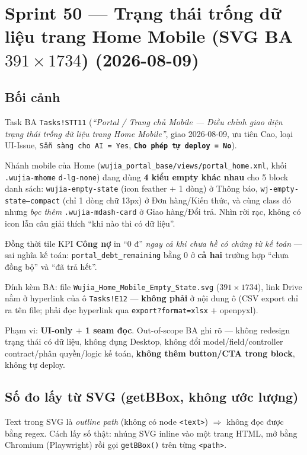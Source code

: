 \chapter{Sprint 50 --- Trạng thái trống dữ liệu trang Home Mobile (SVG BA $391\times1734$) (2026-08-09)}

\section{Bối cảnh}

Task BA \texttt{Tasks!STT11} (\emph{``Portal / Trang chủ Mobile --- Điều chỉnh giao diện trạng
thái trống dữ liệu trang Home Mobile''}, giao 2026-08-09, ưu tiên Cao, loại UI-Issue,
\texttt{Sẵn sàng cho AI = Yes}, \textbf{\texttt{Cho phép tự deploy = No}}).

Nhánh mobile của Home (\texttt{wujia\_portal\_base/views/portal\_home.xml}, khối
\texttt{.wujia-mhome} \texttt{d-lg-none}) đang dùng \textbf{4 kiểu empty khác nhau} cho 5 block
danh sách: \texttt{wujia-empty-state} (icon feather $+$ 1 dòng) ở Thông báo,
\texttt{wj-empty-state--compact} (chỉ 1 dòng chữ 13px) ở Đơn hàng/Kiến thức, và cùng class đó
nhưng \emph{bọc thêm} \texttt{.wujia-mdash-card} ở Giao hàng/Đổi trả. Nhìn rời rạc, không có icon
lẫn câu giải thích ``khi nào thì có dữ liệu''.

Đồng thời tile KPI \textbf{Công nợ} in ``0 đ'' \emph{ngay cả khi chưa hề có chứng từ kế toán} ---
sai nghĩa kế toán: \texttt{portal\_debt\_remaining} bằng $0$ ở \textbf{cả hai} trường hợp ``chưa
đồng bộ'' và ``đã trả hết''.

Đính kèm BA: file \texttt{Wujia\_Home\_Mobile\_Empty\_State.svg} ($391\times1734$), link Drive
nằm ở hyperlink của ô \texttt{Tasks!E12} --- \textbf{không phải} ở nội dung ô (CSV export chỉ ra
tên file; phải đọc hyperlink qua \texttt{export?format=xlsx} $+$ openpyxl).

Phạm vi: \textbf{UI-only $+$ 1 seam đọc}. Out-of-scope BA ghi rõ --- không redesign trạng thái có
dữ liệu, không đụng Desktop, không đổi model/field/controller contract/phân quyền/logic kế toán,
\textbf{không thêm button/CTA trong block}, không tự deploy.

\section{Số đo lấy từ SVG (getBBox, không ước lượng)}

Text trong SVG là \emph{outline path} (không có node \texttt{<text>}) $\Rightarrow$ không đọc
được bằng regex. Cách lấy số thật: nhúng SVG inline vào một trang HTML, mở bằng Chromium
(Playwright) rồi gọi \texttt{getBBox()} trên từng \texttt{<path>}.

